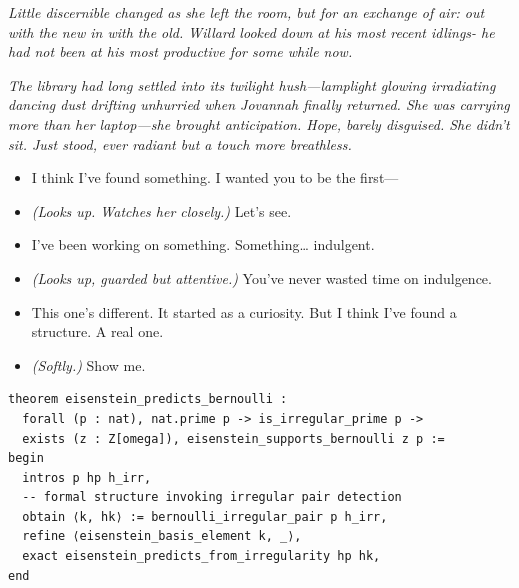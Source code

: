 \textit{Little discernible changed as she left the room, but for an exchange of air: out with the new in with the old. Willard looked down at his most recent idlings- he had not been at his most productive for some while now.}

\bigskip

\textit{The library had long settled into its twilight hush—lamplight glowing irradiating dancing dust drifting unhurried when Jovannah finally returned. She was carrying more than her laptop—she brought anticipation. Hope, barely disguised. She didn’t sit. Just stood, ever radiant but a touch more breathless.}

\begin{itemize}
    \item[\textbf{Jovannah:}] I think I’ve found something. I wanted you to be the first—

    \item[\textbf{Willard:}] \textit{(Looks up. Watches her closely.)} Let’s see.

    \item[\textbf{Jovannah:}] I’ve been working on something. Something… indulgent.

    \item[\textbf{Willard:}] \textit{(Looks up, guarded but attentive.)} You’ve never wasted time on indulgence.

    \item[\textbf{Jovannah:}] This one’s different. It started as a curiosity. But I think I’ve found a structure. A real one.

    \item[\textbf{Willard:}] \textit{(Softly.)} Show me.
\end{itemize}
{\footnotesize
\begin{verbatim}
theorem eisenstein_predicts_bernoulli :
  forall (p : nat), nat.prime p -> is_irregular_prime p ->
  exists (z : Z[omega]), eisenstein_supports_bernoulli z p :=
begin
  intros p hp h_irr,
  -- formal structure invoking irregular pair detection
  obtain ⟨k, hk⟩ := bernoulli_irregular_pair p h_irr,
  refine ⟨eisenstein_basis_element k, _⟩,
  exact eisenstein_predicts_from_irregularity hp hk,
end
\end{verbatim}
}

